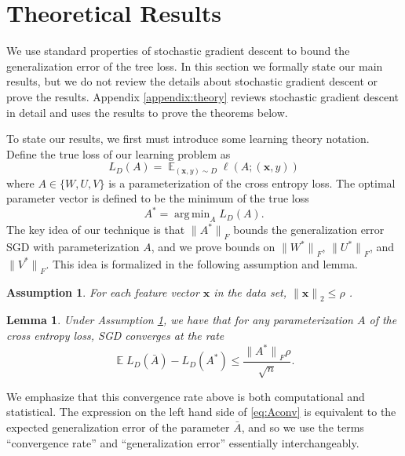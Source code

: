 \documentclass[twoside]{article}
\newtheorem{assumption}{Assumption}
\newtheorem{lemma}{Lemma}
\DeclareMathOperator{\E}{\mathbb E}
\DeclareMathOperator*{\argmin}{arg\,min}
\renewcommand{\star}[1]{{#1}^{*}}
\newcommand{\x}{\mathbf x}
\newcommand{\ltwo}[1]{{\lVert {#1} \rVert}_2}
\newcommand{\lF}[1]{{\lVert {#1} \rVert}_F}
\begin{document}

\section{Theoretical Results}
\label{sec:theory}

We use standard properties of stochastic gradient descent to bound the generalization error of the tree loss.
In this section we formally state our main results,
but we do not review the details about stochastic gradient descent or prove the results.
Appendix \ref{appendix:theory} reviews stochastic gradient descent in detail and uses the results to prove the theorems below.

To state our results, we first must introduce some learning theory notation.
Define the true loss of our learning problem as
\begin{equation}
    L_D(A) = \E_{(\x,y)\sim D} \ell(A; (\x, y))
\end{equation}
where $A \in \{W, U, V\}$ is a parameterization of the cross entropy loss.
The optimal parameter vector is defined to be the minimum of the true loss
\begin{equation}
    \star A = \argmin_{A} L_D(A).
\end{equation}
The key idea of our technique is that $\lF{\star A}$ bounds the generalization error SGD with parameterization $A$,
and we prove bounds on $\lF{\star W}$, $\lF{\star U}$, and $\lF{\star V}$.
This idea is formalized in the following assumption and lemma.

\begin{assumption}
    \label{ass:lip}
    For each feature vector $\x$ in the data set, 
        $\ltwo{\x} \le \rho$
        .
\end{assumption}
\begin{lemma}
    \label{ref:cor:A}
    Under Assumption \ref{ass:lip},
    we have that for any parameterization $A$ of the cross entropy loss,
    SGD converges at the rate
    \begin{equation}
        \E L_D(\bar A) - L_D(\star A) \le \frac{\lF{\star A}\rho}{\sqrt n}.
        \label{eq:Aconv}
    \end{equation}
\end{lemma}

We emphasize that this convergence rate above is both computational and statistical.
The expression on the left hand side of \eqref{eq:Aconv} is equivalent to the expected generalization error of the parameter $\bar A$,
and so we use the terms ``convergence rate'' and ``generalization error'' essentially interchangeably.
\end{document}
